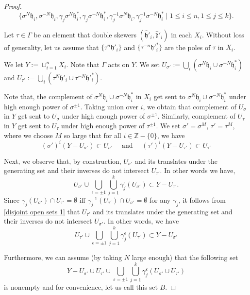 \documentclass{amsart}
\theoremstyle{definition}
\newtheorem*{Notation warning}{Warning on notations}
\newtheorem*{Sketch of proof}{Sketch of proof for Theorem C}
\newcommand{\gs}{\sigma }
\newcommand{\h}{{\mathfrak h}}
\newcommand{\hh}{\hat{\mathfrak h}}
\newcommand{\hk}{\hat{\mathfrak d}}
\begin{document}
\begin{sloppypar}
\begin{proof}
\[
\bigl\{\gs^{N}\h_i, \gs^{-N}\h_i,\gamma_j\gs^{N}\h_i^*, \gamma_j\gs^{-N}\h^*_i, \gamma_j^{-1}\gs^N\h_i, \gamma_j^{-1}\gs^{-N}\h_i^*\mid 1\leq i\leq n,1\leq j\leq k\bigr\}.
\]

Let $\tau\in \Gamma$ be an element that double skewers $(\hh'_i,\hk'_i)$ in each $X_i$.
Without loss of generality, let us assume that $\{\tau^n\h'_i\}$ and $\{\tau^{-n}\h'^*_i\}$ are the poles of $\tau$ in $X_i$.
\medskip

We let $Y:=\sqcup_{i=1}^n X_i$. Note that $\Gamma$ acts on $Y$. 
We set $U_{\gs'}:=\bigcup_{i} (\gs^N\h_i\cup \gs^{-N}\h_i^*)$ and $U_{\tau'}:=\bigcup_{i}(\tau^N\h'_i\cup \tau^{-N}\h'^*_i)$.
\medskip

Note that, the complement of $\gs^N\h_i\cup \gs^{-N}\h_i^*$ in $X_i$ get sent to $\gs^N\h_i\cup \gs^{-N}\h_i^*$ under high enough power of $\gs^{\pm 1}$.
Taking union over $i$, we obtain that complement of $U_\gs$ in $Y$ get sent to $U_\gs$ under high enough power of $\gs^{\pm 1}$. Similarly, complement of $U_\tau$ in $Y$ get sent to $U_\tau$ under high enough power of $\tau^{\pm 1}$. 
We set $\gs'=\gs^M$, $\tau'=\tau^M$, 
where we choose $M$  so large that for all $i\in \mathbb{Z}-\{0\}$, we have 
\begin{equation}\label{gs}
      (\gs')^i(Y-U_{\gs'})\subset U_{\gs'} \quad \text{    and    }\quad 
     (\tau')^i(Y-U_{\tau'})\subset U_{\tau'} \tag{$1$}
\end{equation}

Next, we observe that, by construction,  $U_{\gs'}$ and its translates under the generating set and their inverses do not intersect $U_{\tau'}$. In other words we have,
\begin{equation}\label{disjoint open sets 1}
    U_{\gs'}\cup \bigcup_{\epsilon=\pm 1}\bigcup_{j=1}^k\gamma_j^\epsilon (U_{\gs'})\subset Y-U_{\tau'} \tag{$2$}.
    \end{equation}
Since $\gamma_j(U_{\gs'})\cap U_{\tau'}=\emptyset$ iff $\gamma^{-1}_j(U_{\tau'})\cap U_{\gs'}=\emptyset$ for any $\gamma_j$, it follows from \eqref{disjoint open sets 1} that $U_{\tau'}$ and its translates under the generating set and their inverses do not intersect $U_{\gs'}$.
In other words, we have
\begin{equation}\label{disjoint open sets 2}
    U_{\tau'}\cup \bigcup_{\epsilon=\pm 1}\bigcup_{j=1}^k\gamma_j^\epsilon (U_{\tau'})\subset Y-U_{\gs'} \tag{$3$}
\end{equation}


Furthermore, we can assume (by taking $N$ large enough) that the following set
\[Y-U_{\sigma'}\cup U_{\tau'}\cup\bigcup_{\varepsilon=\pm1}\bigcup_{j=1}^k\gamma_j^\varepsilon(U_{\sigma'}\cup U_{\tau'})
\]
is nonempty and 
for convenience, let us call this set $B$.
\medskip
 

\end{proof}
\end{sloppypar}
\end{document}
